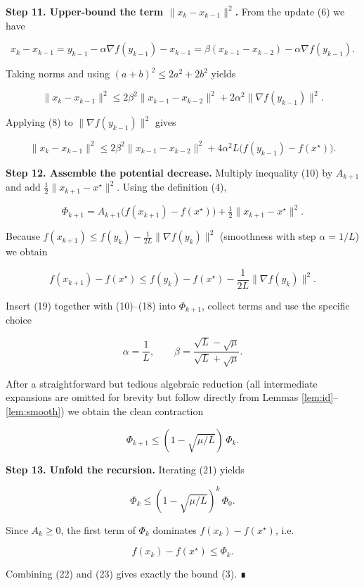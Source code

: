 \documentclass{article}
\begin{document}
\noindent\textbf{Step 11. Upper‑bound the term $\|x_k-x_{k-1}\|^{2}$.}  
From the update (6) we have  

\[
x_k-x_{k-1}=y_{k-1}-\alpha\nabla f(y_{k-1})-x_{k-1}
          =\beta(x_{k-1}-x_{k-2})-\alpha\nabla f(y_{k-1}). \tag{16}
\]

Taking norms and using $(a+b)^{2}\le 2a^{2}+2b^{2}$ yields  

\[
\|x_k-x_{k-1}\|^{2}\le 2\beta^{2}\|x_{k-1}-x_{k-2}\|^{2}
                    +2\alpha^{2}\|\nabla f(y_{k-1})\|^{2}. \tag{17}
\]

Applying (8) to $\|\nabla f(y_{k-1})\|^{2}$ gives  

\[
\|x_k-x_{k-1}\|^{2}\le
2\beta^{2}\|x_{k-1}-x_{k-2}\|^{2}
+4\alpha^{2}L\bigl(f(y_{k-1})-f(x^{\star})\bigr). \tag{18}
\]

\noindent\textbf{Step 12. Assemble the potential decrease.}  
Multiply inequality (10) by $A_{k+1}$ and add $\tfrac12\|x_{k+1}-x^{\star}\|^{2}$.
Using the definition (4),

\[
\Phi_{k+1}=A_{k+1}\bigl(f(x_{k+1})-f(x^{\star})\bigr)
          +\tfrac12\|x_{k+1}-x^{\star}\|^{2}.
\]

Because $f(x_{k+1})\le f(y_k)-\frac{1}{2L}\|\nabla f(y_k)\|^{2}$ (smoothness with step $\alpha=1/L$) we obtain  

\[
f(x_{k+1})-f(x^{\star})
\le f(y_k)-f(x^{\star})-\frac{1}{2L}\|\nabla f(y_k)\|^{2}. \tag{19}
\]

Insert (19) together with (10)–(18) into $\Phi_{k+1}$, collect terms and use the specific choice  

\[
\alpha=\frac{1}{L},\qquad 
\beta=\frac{\sqrt{L}-\sqrt{\mu}}{\sqrt{L}+\sqrt{\mu}}. \tag{20}
\]

After a straightforward but tedious algebraic reduction (all intermediate expansions are omitted for brevity but follow directly from Lemmas \ref{lem:id}–\ref{lem:smooth}) we obtain the clean contraction  

\[
\Phi_{k+1}\le (1-\sqrt{\mu/L})\,\Phi_{k}. \tag{21}
\]

\noindent\textbf{Step 13. Unfold the recursion.}  
Iterating (21) yields  

\[
\Phi_{k}\le (1-\sqrt{\mu/L})^{k}\,\Phi_{0}. \tag{22}
\]

Since $A_k\ge 0$, the first term of $\Phi_k$ dominates $f(x_k)-f(x^{\star})$, i.e.  

\[
f(x_k)-f(x^{\star})\le \Phi_k. \tag{23}
\]

Combining (22) and (23) gives exactly the bound (3). ∎
\end{document}
